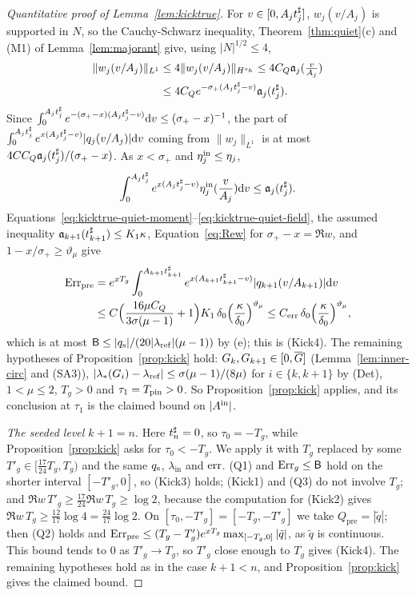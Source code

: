 \begin{proof}[Quantitative proof of Lemma~\ref{lem:kicktrue}]
For $v\in[0,A_jt^\sharp_j]$, $w_j(v/A_j)$ is supported in $N$, so the
Cauchy-Schwarz inequality, Theorem~\ref{thm:quiet}(c) and (M1) of
Lemma~\ref{lem:majorant} give, using $|N|^{1/2}\le4$,
\begin{equation}
\label{eq:kicktrue-quiet-L1}
\begin{aligned}
\|w_j(v/A_j)\|_{L^1}
&\le 4\|w_j(v/A_j)\|_{H^{s_h}}\le 4C_Q\mathfrak{a}_j(\tfrac{v}{A_j})\\
&\le 4C_Qe^{-\sigma_+(A_jt^\sharp_j-v)}\mathfrak{a}_j(t^\sharp_j).
\end{aligned}
\end{equation}
Since $\int_0^{A_jt^\sharp_j}e^{-(\sigma_+-x)(A_jt^\sharp_j-v)}\dd v\le(\sigma_+-x)^{-1}$, the
part of $\int_0^{A_jt^\sharp_j}e^{x(A_jt^\sharp_j-v)}|q_j(v/A_j)|\dd v$ coming from
$\|w_j\|_{L^1}$ is at most $4CC_Q\mathfrak{a}_j(t^\sharp_j)/(\sigma_+-x)$.
As $x<\sigma_+$ and $\eta^{\mathrm{in}}_j\le\eta_j$,
\begin{equation}
\label{eq:kicktrue-quiet-field}
\int_0^{A_jt^\sharp_j}e^{x(A_jt^\sharp_j-v)}\eta^{\mathrm{in}}_j(\frac{v}{A_j})\dd v\le\mathfrak{a}_j(t^\sharp_j).
\end{equation}
Equations~\eqref{eq:kicktrue-quiet-moment}--\eqref{eq:kicktrue-quiet-field},
the assumed inequality $\mathfrak{a}_{k+1}(t^\sharp_{k+1})\le K_1\kappa$,
Equation~\eqref{eq:Rew} for $\sigma_+-x=\Re w$, and $1-x/\sigma_+\ge\vartheta_\mu$ give
\[
\begin{aligned}
\mathrm{Err}_{\mathrm{pre}}&=e^{xT_g}\int_0^{A_{k+1}t^\sharp_{k+1}}e^{x(A_{k+1}t^\sharp_{k+1}-v)}|q_{k+1}(v/A_{k+1})|\dd v\\
&\le C\Big(\frac{16\mu C_Q}{3\sigma(\mu-1)}+1\Big)K_1\,\delta_0\Big(\frac\kappa{\delta_0}\Big)^{\vartheta_\mu}
\le C_{\mathrm{err}}\,\delta_0\Big(\frac\kappa{\delta_0}\Big)^{\vartheta_\mu},
\end{aligned}
\]
which is at most $\mathsf B\le|q_{\mathrm{s}}|/(20|\lambda_{\mathrm{ref}}|(\mu-1))$ by (e); this is (Kick4). The
remaining hypotheses of Proposition~\ref{prop:kick} hold: $G_k,G_{k+1}\in[0,\overline{G}]$
(Lemma~\ref{lem:inner-circ} and (SA3)),
$|\lambda_*(G_i)-\lambda_{\mathrm{ref}}|\le\sigma(\mu-1)/(8\mu)$ for $i\in\{k,k+1\}$ by (Det),
$1<\mu\le2$, $T_g>0$ and $\tau_1=T_{\mathrm{pin}}>0$. So Proposition~\ref{prop:kick} applies,
and its conclusion at $\tau_1$ is the claimed bound on $|A^{\mathrm{in}}|$.

\emph{The seeded level $k+1=n$.} Here $t^\sharp_n=0$, so $\tau_0=-T_g$, while
Proposition~\ref{prop:kick} asks for $\tau_0<-T_g$. We apply it with $T_g$
replaced by some $T'_g\in[\frac{17}{24}T_g,T_g)$ and the same $q_{\mathrm{s}}$, $\lambda_{\mathrm{in}}$ and
$\mathrm{err}$. (Q1) and $\mathrm{Err}_g\le\mathsf B$ hold on the shorter interval $[-T'_g,0]$, so
(Kick3) holds; (Kick1) and (Q3) do not involve $T_g$; and
$\Re w\,T'_g\ge\frac{17}{24}\Re w\,T_g\ge\log2$, because the computation for (Kick2)
gives $\Re w\,T_g\ge\frac{12}{17}\log4=\frac{24}{17}\log2$.
On $[\tau_0,-T'_g]=[-T_g,-T'_g]$ we take $Q_{\mathrm{pre}}=|\tilde q|$; then (Q2) holds
and $\mathrm{Err}_{\mathrm{pre}}\le(T_g-T'_g)e^{xT_g}\max_{[-T_g,0]}|\tilde q|$, as $\tilde q$ is continuous.
This bound tends to $0$ as $T'_g\to T_g$, so $T'_g$ close enough to $T_g$ gives
(Kick4). The remaining hypotheses hold as in
the case $k+1<n$, and Proposition~\ref{prop:kick} gives the claimed bound.
\end{proof}

